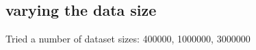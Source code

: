 \subsection{varying the data size}

\noindent Tried a number of dataset sizes: 400000, 1000000, 3000000






